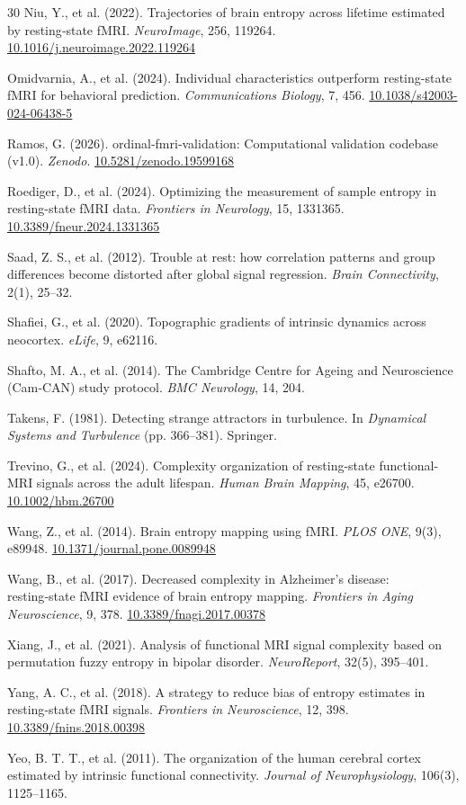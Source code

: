 \documentclass[12pt,a4paper]{article}
\providecommand{\doi}[1]{\href{https://doi.org/#1}{#1}}
\begin{document}
\begin{thebibliography}{30}
		Niu, Y., et al. (2022). Trajectories of brain entropy across lifetime estimated by resting‑state fMRI. \emph{NeuroImage}, 256, 119264. \doi{10.1016/j.neuroimage.2022.119264}
		
		Omidvarnia, A., et al. (2024). Individual characteristics outperform resting-state fMRI for behavioral prediction. \emph{Communications Biology}, 7, 456. \doi{10.1038/s42003-024-06438-5}
		
		Ramos, G. (2026). ordinal‑fmri‑validation: Computational validation codebase (v1.0). \emph{Zenodo}. \doi{10.5281/zenodo.19599168}
		
		Roediger, D., et al. (2024). Optimizing the measurement of sample entropy in resting-state fMRI data. \emph{Frontiers in Neurology}, 15, 1331365. \doi{10.3389/fneur.2024.1331365}
		
		Saad, Z. S., et al. (2012). Trouble at rest: how correlation patterns and group differences become distorted after global signal regression. \emph{Brain Connectivity}, 2(1), 25–32.
		
		Shafiei, G., et al. (2020). Topographic gradients of intrinsic dynamics across neocortex. \emph{eLife}, 9, e62116.
		
		Shafto, M. A., et al. (2014). The Cambridge Centre for Ageing and Neuroscience (Cam‑CAN) study protocol. \emph{BMC Neurology}, 14, 204.
		
		Takens, F. (1981). Detecting strange attractors in turbulence. In \emph{Dynamical Systems and Turbulence} (pp. 366–381). Springer.
		
		Trevino, G., et al. (2024). Complexity organization of resting-state functional-MRI signals across the adult lifespan. \emph{Human Brain Mapping}, 45, e26700. \doi{10.1002/hbm.26700}
		
		Wang, Z., et al. (2014). Brain entropy mapping using fMRI. \emph{PLOS ONE}, 9(3), e89948. \doi{10.1371/journal.pone.0089948}
		
		Wang, B., et al. (2017). Decreased complexity in Alzheimer's disease: resting‑state fMRI evidence of brain entropy mapping. \emph{Frontiers in Aging Neuroscience}, 9, 378. \doi{10.3389/fnagi.2017.00378}
		
		Xiang, J., et al. (2021). Analysis of functional MRI signal complexity based on permutation fuzzy entropy in bipolar disorder. \emph{NeuroReport}, 32(5), 395–401.
		
		Yang, A. C., et al. (2018). A strategy to reduce bias of entropy estimates in resting‑state fMRI signals. \emph{Frontiers in Neuroscience}, 12, 398. \doi{10.3389/fnins.2018.00398}
		
		Yeo, B. T. T., et al. (2011). The organization of the human cerebral cortex estimated by intrinsic functional connectivity. \emph{Journal of Neurophysiology}, 106(3), 1125–1165.
		
	\end{thebibliography}
	
\end{document}
